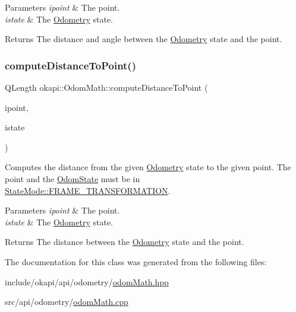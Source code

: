\begin{DoxyParams}{Parameters}
{\em ipoint} & The point. \\
\hline
{\em istate} & The \mbox{\hyperlink{classokapi_1_1Odometry}{Odometry}} state. \\
\hline
\end{DoxyParams}
\begin{DoxyReturn}{Returns}
The distance and angle between the \mbox{\hyperlink{classokapi_1_1Odometry}{Odometry}} state and the point. 
\end{DoxyReturn}
\mbox{\label{classokapi_1_1OdomMath_a58abbf02061a774eb292cc62a0371afa}} 
\subsubsection{\texorpdfstring{computeDistanceToPoint()}{computeDistanceToPoint()}}
{\footnotesize\ttfamily Q\+Length okapi\+::\+Odom\+Math\+::compute\+Distance\+To\+Point (\begin{DoxyParamCaption}\item[{const \mbox{\hyperlink{structokapi_1_1Point}{Point}} \&}]{ipoint,  }\item[{const \mbox{\hyperlink{structokapi_1_1OdomState}{Odom\+State}} \&}]{istate }\end{DoxyParamCaption})\hspace{0.3cm}{\ttfamily [static]}}

Computes the distance from the given \mbox{\hyperlink{classokapi_1_1Odometry}{Odometry}} state to the given point. The point and the \mbox{\hyperlink{structokapi_1_1OdomState}{Odom\+State}} must be in {\ttfamily \mbox{\hyperlink{namespaceokapi_af37fbd761bd859a00ff4dd4a87dd8c07ad5ed7666e5cebf60d3af20a5a46edf3b}{State\+Mode\+::\+F\+R\+A\+M\+E\+\_\+\+T\+R\+A\+N\+S\+F\+O\+R\+M\+A\+T\+I\+ON}}}.


\begin{DoxyParams}{Parameters}
{\em ipoint} & The point. \\
\hline
{\em istate} & The \mbox{\hyperlink{classokapi_1_1Odometry}{Odometry}} state. \\
\hline
\end{DoxyParams}
\begin{DoxyReturn}{Returns}
The distance between the \mbox{\hyperlink{classokapi_1_1Odometry}{Odometry}} state and the point. 
\end{DoxyReturn}


The documentation for this class was generated from the following files\+:\begin{DoxyCompactItemize}
\item 
include/okapi/api/odometry/\mbox{\hyperlink{odomMath_8hpp}{odom\+Math.\+hpp}}\item 
src/api/odometry/\mbox{\hyperlink{odomMath_8cpp}{odom\+Math.\+cpp}}\end{DoxyCompactItemize}
